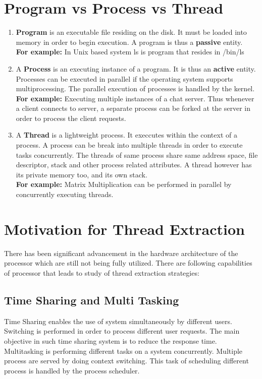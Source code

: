 \documentclass[a4paper,12pt]{article}
\begin{document}
\section{ Program vs Process vs Thread}
\begin{enumerate}
\item \textbf{Program} is an executable file residing on the disk. It must be loaded into memory in order to begin execution. A program is thus a \textbf{passive} entity.
\\
\textbf{For example:} In Unix based system ls is program that resides in /bin/ls

\item A \textbf{Process} is an executing instance of a program. It is thus an \textbf{active} entity. Processes can be executed in parallel if the operating system supports multiprocessing. The parallel execution of processes is handled by the kernel.
\\
\textbf{For example:} Executing multiple instances of a chat server. Thus whenever a client connects to server, a separate process can be forked at the server in order to process the client requests.

\item A \textbf{Thread} is a lightweight process. It execcutes within the context of a process. A process can be break into multiple threads in order to execute tasks concurrently. The threads of same process share same address space, file descriptor, stack and other process related attributes. A thread however has its private memory too, and its own stack. 
\\
\textbf{For example:} Matrix Multiplication can be performed in parallel by concurrently executing threads.
\end{enumerate}

\section{Motivation for Thread Extraction}
There has been significant advancement in the hardware architecture of the processor which are still not being fully utilized. There are following capabilities of processor that leads to study of thread extraction strategies:
\subsection{Time Sharing and Multi Tasking}
Time Sharing enables the use of system simultaneously by different users. Switching is performed in order to process different user requests. The main objective in such time sharing system is to reduce the response time. 
\\
Multitasking is performing different tasks on a system concurrently. Multiple process are served by doing context switching. This task of scheduling different process is handled by the process scheduler.
\end{document}
